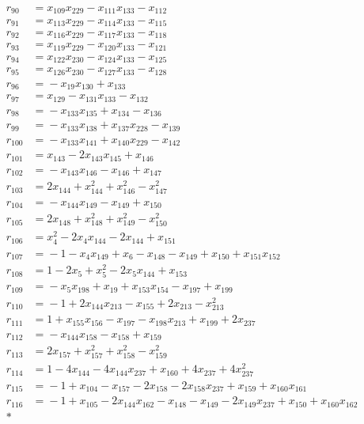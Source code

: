 \documentclass[11pt]{article}
\theoremstyle{remark}\newtheorem{remark}[theorem]{Remark}
\begin{document}
\begin{align*}
r_{90}&={}x_{109}x_{229}-x_{111}x_{133}-x_{112}\\[2pt]
r_{91}&={}x_{113}x_{229}-x_{114}x_{133}-x_{115}\\[2pt]
r_{92}&={}x_{116}x_{229}-x_{117}x_{133}-x_{118}\\[2pt]
r_{93}&={}x_{119}x_{229}-x_{120}x_{133}-x_{121}\\[2pt]
r_{94}&={}x_{122}x_{230}-x_{124}x_{133}-x_{125}\\[2pt]
r_{95}&={}x_{126}x_{230}-x_{127}x_{133}-x_{128}\\[2pt]
r_{96}&={}-x_{19}x_{130}+x_{133}\\[2pt]
r_{97}&={}x_{129}-x_{131}x_{133}-x_{132}\\[2pt]
r_{98}&={}-x_{133}x_{135}+x_{134}-x_{136}\\[2pt]
r_{99}&={}-x_{133}x_{138}+x_{137}x_{228}-x_{139}\\[2pt]
r_{100}&={}-x_{133}x_{141}+x_{140}x_{229}-x_{142}\\[2pt]
r_{101}&={}x_{143}-2x_{143}x_{145}+x_{146}\\[2pt]
r_{102}&={}-x_{143}x_{146}-x_{146}+x_{147}\\[2pt]
r_{103}&={}2x_{144}+x_{144}^{2}+x_{146}^{2}-x_{147}^{2}\\[2pt]
r_{104}&={}-x_{144}x_{149}-x_{149}+x_{150}\\[2pt]
r_{105}&={}2x_{148}+x_{148}^{2}+x_{149}^{2}-x_{150}^{2}\\[2pt]
r_{106}&={}x_{4}^{2}-2x_{4}x_{144}-2x_{144}+x_{151}\\[2pt]
r_{107}&={}-1-x_{4}x_{149}+x_{6}-x_{148}-x_{149}+x_{150}+x_{151}x_{152}\\[2pt]
r_{108}&={}1-2x_{5}+x_{5}^{2}-2x_{5}x_{144}+x_{153}\\[2pt]
r_{109}&={}-x_{5}x_{198}+x_{19}+x_{153}x_{154}-x_{197}+x_{199}\\[2pt]
r_{110}&={}-1+2x_{144}x_{213}-x_{155}+2x_{213}-x_{213}^{2}\\[2pt]
r_{111}&={}1+x_{155}x_{156}-x_{197}-x_{198}x_{213}+x_{199}+2x_{237}\\[2pt]
r_{112}&={}-x_{144}x_{158}-x_{158}+x_{159}\\[2pt]
r_{113}&={}2x_{157}+x_{157}^{2}+x_{158}^{2}-x_{159}^{2}\\[2pt]
r_{114}&={}1-4x_{144}-4x_{144}x_{237}+x_{160}+4x_{237}+4x_{237}^{2}\\[2pt]
r_{115}&={}-1+x_{104}-x_{157}-2x_{158}-2x_{158}x_{237}+x_{159}+x_{160}x_{161}\\[2pt]
r_{116}&={}-1+x_{105}-2x_{144}x_{162}-x_{148}-x_{149}-2x_{149}x_{237}+x_{150}+x_{160}x_{162}\\*

\end{align*}
\end{document}
